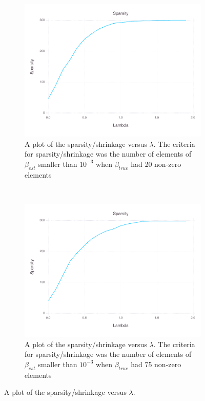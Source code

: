 \documentclass[12pt, leqno]{article}
\begin{document}
\begin{figure}
\centering 
\begin{subfigure}[b]{0.5\textwidth}
  \includegraphics[width=\textwidth]{sparsityplotcount-20.pdf}
  \caption{A plot of the sparsity/shrinkage versus $\lambda$. The criteria for
    sparsity/shrinkage was the number of elements of $\beta_{est}$
    smaller than $10^{-3}$ when $\beta_{true}$ had 20 non-zero elements}
\label{sparse20}
\end{subfigure}\\
\begin{subfigure}[b]{0.5\textwidth}
  \includegraphics [width=\textwidth]{sparsityplotcount-75.pdf}
  \caption{A plot of the sparsity/shrinkage versus $\lambda$. The criteria for
    sparsity/shrinkage was the number of elements of $\beta_{est}$
    smaller than $10^{-3}$ when $\beta_{true}$ had 75 non-zero elements}
\label{sparse75}
\end{subfigure}
        \caption{A plot of the sparsity/shrinkage versus $\lambda$. }\label{fig:sparse}
\end{figure}
\end{document}
